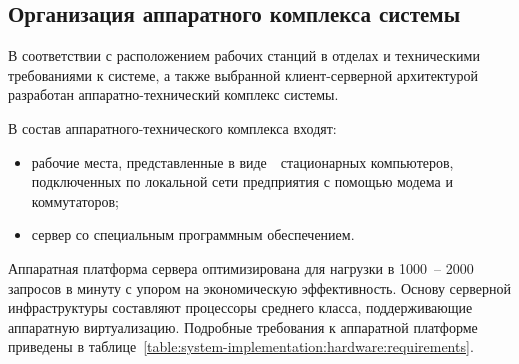 \subsection{Организация аппаратного комплекса системы}
\label{sub:system-implementation:hardware}


В соответствии с расположением рабочих станций в отделах и техническими требованиями к системе, а также выбранной клиент-серверной архитектурой разработан аппаратно-технический комплекс системы.

В состав аппаратного-технического комплекса входят:

\begin{itemize}
    \item рабочие места, представленные в виде~\NumOfWorkstations~стационарных компьютеров, подключенных по локальной сети предприятия с помощью модема и коммутаторов;
    \item сервер со специальным программным обеспечением.
\end{itemize}

Аппаратная платформа сервера оптимизирована для нагрузки в 1000~-- 2000 запросов в минуту с упором на экономическую эффективность. Основу серверной инфраструктуры составляют процессоры среднего класса, поддерживающие аппаратную виртуализацию. Подробные требования к аппаратной платформе приведены в таблице~\ref{table:system-implementation:hardware:requirements}.

